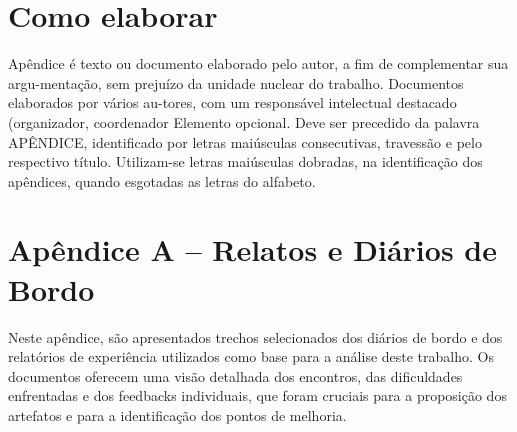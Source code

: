 %
%

\begin{apendicesenv}

    \chapter{Como elaborar}
    
    Apêndice é texto ou documento elaborado pelo autor, a fim de
    complementar sua argu-mentação, sem prejuízo da unidade nuclear do trabalho. Documentos elaborados por vários au-tores, com um responsável intelectual destacado (organizador, coordenador Elemento opcional.  Deve ser precedido da palavra APÊNDICE, identificado por letras maiúsculas consecutivas, travessão e pelo respectivo título. Utilizam-se letras maiúsculas dobradas, na identificação dos apêndices, quando esgotadas as letras do alfabeto.
    
    \chapter{Apêndice A – Relatos e Diários de Bordo}
    \label{chap:apendiceA}
    Neste apêndice, são apresentados trechos selecionados dos diários de bordo e dos relatórios de experiência utilizados como base para a análise deste trabalho. Os documentos \cite{rel_danrley_core_2024, rel_labtech_2024_1, rel_labtech_2023_2, rel_lelton_eventos_2024, rel_polyana_2024} oferecem uma visão detalhada dos encontros, das dificuldades enfrentadas e dos feedbacks individuais, que foram cruciais para a proposição dos artefatos e para a identificação dos pontos de melhoria.
    
    \end{apendicesenv}
    